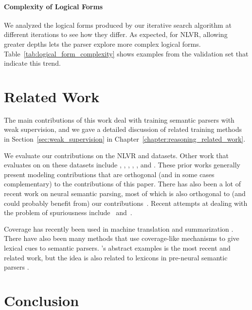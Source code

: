 \paragraph{Complexity of Logical Forms} We analyzed the logical forms produced by our iterative search algorithm at different iterations to see how they differ. As expected, for NLVR, allowing greater depths lets the parser explore more complex logical forms. Table~\ref{tab:logical_form_complexity} shows examples from the validation set that indicate this trend.

\section{Related Work} \label{sec:iterative_search_related_work}
The main contributions of this work deal with training semantic parsers with
weak supervision, and we gave a detailed discussion of related training methods
in Section~\ref{sec:weak_supervision} in Chapter~\ref{chapter:reasoning_related_work}.

We evaluate our contributions on the NLVR and \WTQ{} datasets.  Other work that
evaluates on on these datasets include \citet{goldman2017weakly},
\citet{tan2018object}, \citet{neelakantan2016learning},
\citet{krishnamurthy2017neural}, \citet{Haug2018NeuralMR}, and
\cite{liang2018memory}.  These prior works generally present modeling
contributions that are orthogonal (and in some cases complementary) to the
contributions of this paper.  There has also been a lot of recent work on
neural semantic parsing, most of which is also orthogonal to (and could
probably benefit from) our
contributions~\cite{dong2016language,jia2016data,Yin2017ASN,krishnamurthy2017neural,rabinovich2017abstract}.
Recent attempts at dealing with the problem of spuriousness
include~\citet{Misra2018PolicySA} and~\citet{guu2017bridging}.

Coverage has recently been used in machine translation \cite{tu2016modeling} and summarization \citep{see2017get}. There have also been many methods that use coverage-like mechanisms to give lexical cues to semantic parsers.  \citet{goldman2017weakly}'s abstract examples is the most recent and related work, but the idea is also related to lexicons in pre-neural semantic parsers \citep{kwiatkowski2011lexical}.


\section{Conclusion}
